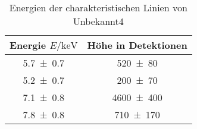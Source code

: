 
\begin{table}[H]
    \centering
    \caption{Energien der charakteristischen Linien von Unbekannt4}
    \label{tab:label}
    \begin{tabular}{c|c}
       Energie $E/\unit{\kilo\electronvolt}$ & Höhe in Detektionen \\
\hline
\num{5.7\pm 0.7} & \num{520\pm 80} \\ 
\num{5.2\pm 0.7} & \num{200\pm 70} \\ 
\num{7.1\pm 0.8} & \num{4600\pm 400} \\ 
\num{7.8\pm 0.8} & \num{710\pm 170} \\ 

    \end{tabular}
\end{table}